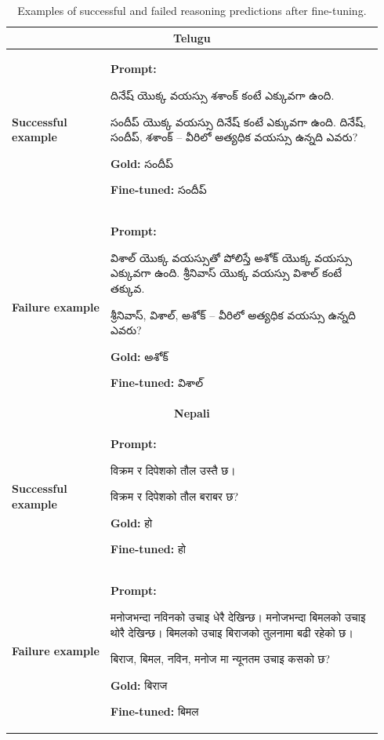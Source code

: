 \documentclass[10pt,a4paper]{article}
\begin{document}
\begin{table}[H]
\centering
\scriptsize
\begin{tabular}{p{0.25\linewidth}p{0.69\linewidth}}

\toprule

\multicolumn{2}{c}{\textbf{Telugu}}\\

\midrule

\textbf{Successful example} &
\textbf{Prompt:} {\telugufont
దినేష్ యొక్క వయస్సు శశాంక్ కంటే ఎక్కువగా ఉంది.

సందీప్ యొక్క వయస్సు దినేష్ కంటే ఎక్కువగా ఉంది. దినేష్, సందీప్,
శశాంక్ -- వీరిలో అత్యధిక వయస్సు ఉన్నది ఎవరు?
}

\textbf{Gold:} {\telugufont సందీప్}

\textbf{Fine-tuned:} {\telugufont సందీప్}

\\[10pt]

\textbf{Failure example} &
\textbf{Prompt:} {\telugufont
విశాల్ యొక్క వయస్సుతో పోలిస్తే అశోక్ యొక్క
వయస్సు ఎక్కువగా ఉంది. శ్రీనివాస్ యొక్క వయస్సు విశాల్ కంటే తక్కువ.

శ్రీనివాస్, విశాల్, అశోక్ -- వీరిలో అత్యధిక వయస్సు ఉన్నది ఎవరు?
}

\textbf{Gold:} {\telugufont అశోక్}

\textbf{Fine-tuned:} {\telugufont విశాల్}

\\

\midrule

\multicolumn{2}{c}{\textbf{Nepali}}\\

\midrule

\textbf{Successful example} &
\textbf{Prompt:} {\devanagarifont
विक्रम र दिपेशको तौल उस्तै छ।

विक्रम र दिपेशको तौल बराबर छ?
}

\textbf{Gold:} {\devanagarifont हो}

\textbf{Fine-tuned:} {\devanagarifont हो}

\\[10pt]

\textbf{Failure example} &
\textbf{Prompt:} {\devanagarifont
मनोजभन्दा नविनको उचाइ धेरै देखिन्छ। मनोजभन्दा
बिमलको उचाइ थोरै देखिन्छ। बिमलको उचाइ बिराजको तुलनामा बढी रहेको छ।

बिराज, बिमल, नविन, मनोज मा न्यूनतम उचाइ कसको छ?
}

\textbf{Gold:} {\devanagarifont बिराज}

\textbf{Fine-tuned:} {\devanagarifont बिमल}

\\

\bottomrule

\end{tabular}

\caption{Examples of successful and failed reasoning predictions
after fine-tuning.}
\end{table}
\end{document}
